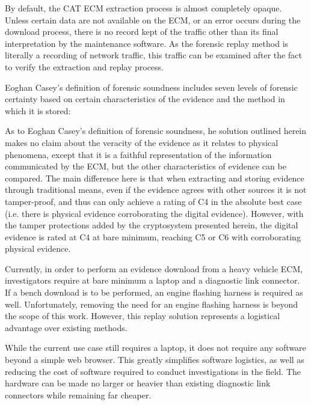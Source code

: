By default, the CAT ECM extraction process is almost completely opaque. Unless certain data are not available on the ECM, or an error
occurs during the download process, there is no record kept of the traffic other than its final interpretation by the maintenance
software. As the forensic replay method is literally a recording of network traffic, this traffic can be examined after the fact
to verify the extraction and replay process.

Eoghan Casey's definition of forensic soundness includes seven levels of forensic certainty based on certain characteristics
of the evidence and the method in which it is stored:

As to Eoghan Casey's definition of forensic soundness, he solution outlined herein makes no claim about the veracity of the evidence as it relates to physical phenomena, except that it 
is a faithful representation of the information communicated
by the ECM, but the other characteristics of evidence can be compared. The main difference here is that when extracting and storing evidence through traditional means, even if the
evidence agrees with other sources it is not tamper-proof, and thus can only achieve a rating of C4 in the absolute best case (i.e. there is physical evidence corroborating the 
digital evidence). However, with the tamper protections added by the cryptosystem presented herein, the digital evidence is rated at C4 at bare minimum, reaching C5 or C6 with corroborating
physical evidence. 


Currently, in order to perform an evidence download from a heavy vehicle ECM, investigators require at bare minimum a laptop and a diagnostic link connector.
If a bench download is to be performed, an engine flashing harness is required as well. Unfortunately, removing the need for an engine flashing harness is
beyond the scope of this work. However, this replay solution represents a logistical advantage over existing methods.

While the current use case still requires a laptop, it does not require any software beyond a simple web browser. This greatly simplifies software logistics, as well
as reducing the cost of software required to conduct investigations in the field. The hardware can be made no larger or heavier than existing diagnostic link connectors
while remaining far cheaper.




